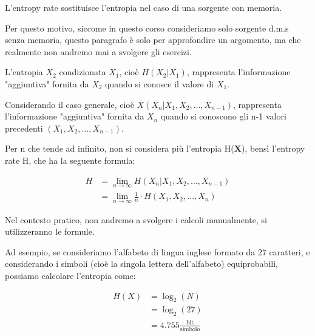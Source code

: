 L'entropy rate sostituisce l'entropia nel caso di una sorgente con memoria. \newline 

\begin{tcolorbox}
    Per questo motivo, siccome in questo corso consideriamo solo sorgente d.m.s senza memoria, 
    questo paragrafo è solo per approfondire un argomento, ma che realmente non andremo mai a svolgere gli esercizi. 
\end{tcolorbox}

L'entropia $X_2$ condizionata $X_1$, cioè $H(X_2 | X_1)$, 
rappresenta l'informazione "aggiuntiva" fornita da $X_2$ quando si conosce il valore di $X_1$. \newline 

Considerando il caso generale, cioè 
$X( X_n | X_1, X_2, \dots, X_{n-1})$, 
rappresenta l'informazione "aggiuntiva" fornita da $X_n$ quando si conoscono gli n-1 valori precedenti 
$(X_1, X_2, \dots, X_{n-1})$. \newline 

Per n che tende ad infinito, non si considera più l'entropia H(\textbf{X}), 
bensì l'entropy rate H, che ha la seguente formula: 

{
    \Large 
    \begin{equation}
        \begin{split}
            H 
            &=
            \lim_{n \to \infty}
            H(X_n | X_1, X_2, \dots, X_{n-1})
            \\
            &= 
            \lim_{n \to \infty}
            \frac{1}{n}
            \cdot
            H(X_1, X_2, \dots, X_{n}) 
        \end{split}
    \end{equation}
}

Nel contesto pratico, non andremo a svolgere i calcoli manualmente, si utilizzeranno le formule. \newline 

Ad esempio, se consideriamo l'alfabeto di lingua inglese formato da 27 caratteri, 
e considerando i simboli (cioè la singola lettera dell'alfabeto) equiprobabili,  
possiamo calcolare l'entropia come: 

{
    \Large 
    \begin{equation}
        \begin{split}
            H(X) 
            &=
            \log_{2} (N)
            \\
            &= 
            \log_{2} (27)
            \\
            &= 
            4.755 \frac{\text{bit}}{\text{simbolo}} 
        \end{split}
    \end{equation}
}

